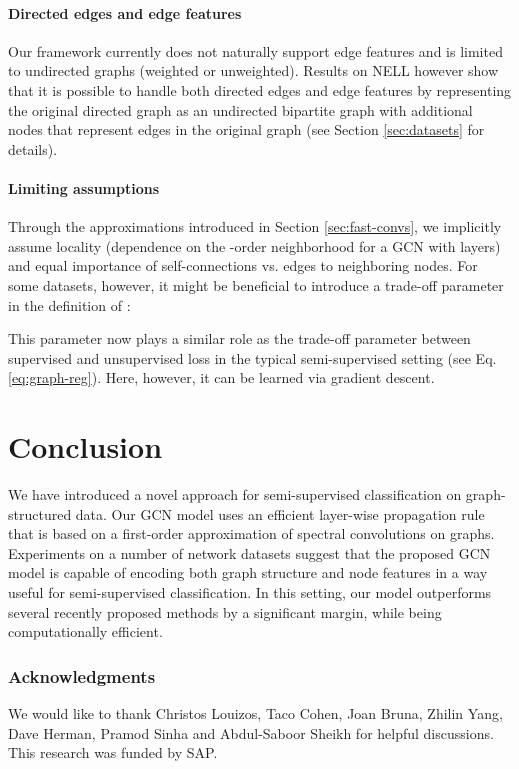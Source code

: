 \documentclass{article} \usepackage{iclr2017_conference,times}
\makeatletter
\newcommand*{\eq}{Eq.\@\xspace}
\newcommand*{\vs}{vs.\@\xspace}
\makeatother
\begin{document}
\paragraph{Directed edges and edge features}
Our framework currently does not naturally support edge features and is limited to undirected graphs (weighted or unweighted). Results on NELL however show that it is possible to handle both directed edges and edge features by representing the original directed graph as an undirected bipartite graph with additional nodes that represent edges in the original graph (see Section \ref{sec:datasets} for details).

\paragraph{Limiting assumptions}
Through the approximations introduced in Section \ref{sec:fast-convs}, we implicitly assume locality (dependence on the -order neighborhood for a GCN with  layers) and equal importance of self-connections \vs edges to neighboring nodes. For some datasets, however, it might be beneficial to introduce a trade-off parameter  in the definition of :

This parameter now plays a similar role as the trade-off parameter between supervised and unsupervised loss in the typical semi-supervised setting (see \eq \ref{eq:graph-reg}). Here, however, it can be learned via gradient descent.

\section{Conclusion}
We have introduced a novel approach for semi-supervised classification on graph-structured data. Our GCN model uses an efficient layer-wise propagation rule that is based on a first-order approximation of spectral convolutions on graphs. Experiments on a number of network datasets suggest that the proposed GCN model is capable of encoding both graph structure and node features in a way useful for semi-supervised classification. In this setting, our model outperforms several recently proposed methods by a significant margin, while being computationally efficient.

\subsubsection*{Acknowledgments}

We would like to thank Christos Louizos, Taco Cohen, Joan Bruna, Zhilin Yang, Dave Herman, Pramod Sinha and Abdul-Saboor Sheikh for helpful discussions. This research was funded by SAP.
\end{document}
